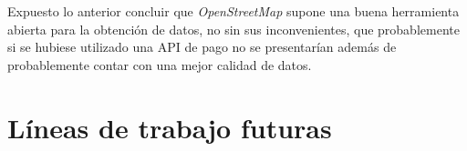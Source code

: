 Expuesto lo anterior concluir que \textit{OpenStreetMap} supone una buena herramienta abierta para la obtención de datos, no sin sus inconvenientes, que probablemente si se hubiese utilizado una API de pago no se presentarían además de probablemente contar con una mejor calidad de datos.



\section{Líneas de trabajo futuras}